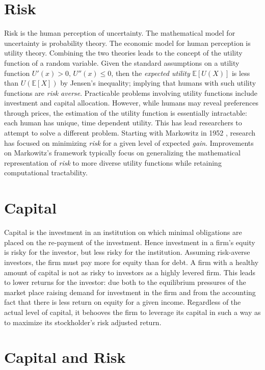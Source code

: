\documentclass[12pt]{article}
\theoremstyle{definition}
\begin{document}
\section{Risk}

Risk is the human perception of uncertainty.  The mathematical model for uncertainty is probability theory. The economic model for human perception is utility theory.  Combining the two theories leads to the concept of the utility function of a random variable.  Given the standard assumptions on a utility function \(U'(x)>0,\,U''(x)\leq 0\), then the \emph{expected utility} \(\mathbb{E}[U(X)]\) is less than \(U(\mathbb{E}[X])\) by Jensen's inequality; implying that humans with such utility functions are \emph{risk averse}.  Practicable problems involving utility functions include investment and capital allocation.  However, while humans may reveal preferences through prices, the estimation of the utility function is essentially intractable: each human has unique, time dependent utility.  This has lead researchers to attempt to solve a different problem.  Starting with Markowitz in 1952 \cite{markowitz1952}, research has focused on minimizing \emph{risk} for a given level of expected \emph{gain}.  Improvements on Markowitz's framework typically focus on generalizing the mathematical representation of \emph{risk} to more diverse utility functions while retaining computational tractability.

\section{Capital}

Capital is the investment in an institution on which minimal obligations are placed on the re-payment of the investment.  Hence investment in a firm's equity is risky for the investor, but less risky for the institution.  Assuming risk-averse investors, the firm must pay more for equity than for debt.  A firm with a healthy amount of capital is not as risky to investors as a highly levered firm.  This leads to lower returns for the investor: due both to the equilibrium pressures of the market place raising demand for investment in the firm and from the accounting fact that there is less return on equity for a given income. Regardless of the actual level of capital, it behooves the firm to leverage its capital in such a way as to maximize its stockholder's risk adjusted return.  

\section{Capital and Risk}
\end{document}
